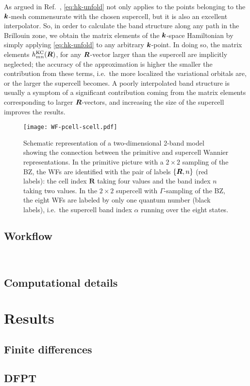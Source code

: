As argued in Ref.~\cite{lee_band_2005}, \cref{eq:hk-unfold} not only applies to the points belonging to the ${\bm k}$-mesh commensurate with the chosen supercell, but it is also an excellent interpolator. So, in order to calculate the band structure along any path in the Brillouin zone, we obtain the matrix elements of the ${\bm k}$-space Hamiltonian by simply applying \cref{eq:hk-unfold} to any arbitrary ${\bm k}$-point. In doing so, the matrix elements $h^{\rm KC}_{mn}({\bm R})$, for any ${\bm R}$-vector larger than the supercell are implicitly neglected; the accuracy of the approximation is higher the smaller the contribution from these terms, i.e.\ the more localized the variational orbitals are, or the larger the supercell becomes. A poorly interpolated band structure is usually a symptom of a significant contribution coming from the matrix elements corresponding to larger ${\bm R}$-vectors, and increasing the size of the supercell improves the results.

\begin{figure}
    \centering
    \texttt{[image: WF-pcell-scell.pdf]}
    \caption[]{Schematic representation of a two-dimensional 2-band model showing the connection between the primitive and supercell Wannier representations. In the primitive picture with a $2\times 2$ sampling of the BZ, the WFs are identified with the pair of labels $\{{\bm R},n\}$ (red labels): the cell index $\bm{R}$ taking four values and the band index $n$ taking two values. In the $2\times 2$ supercell with $\Gamma$-sampling of the BZ, the eight WFs are labeled by only one quantum number (black labels), i.e.\ the supercell band index $\alpha$ running over the eight states.}
    \label{fig:map-wf}
\end{figure}


\subsection{Workflow\label{sec:workflow}}

\begin{figure}
    \centering
     \\
    \caption[]{}
    \label{fig:workflow}
\end{figure}

\subsection{Computational details\label{sec:computational-details}}

\section{Results\label{sec:results-bands}}

\subsection{Finite differences\label{sec:results-dscf}}

\subsection{DFPT\label{sec:results-dfpt}}

